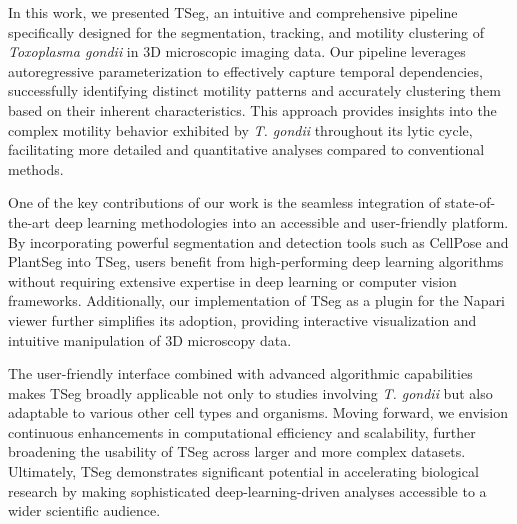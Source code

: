 \documentclass[./dissertation.tex]{subfiles}
\begin{document}
In this work, we presented TSeg, an intuitive and comprehensive pipeline specifically designed for the segmentation, tracking, and motility clustering of \textit{Toxoplasma gondii} in 3D microscopic imaging data. Our pipeline leverages autoregressive parameterization to effectively capture temporal dependencies, successfully identifying distinct motility patterns and accurately clustering them based on their inherent characteristics. This approach provides insights into the complex motility behavior exhibited by \textit{T. gondii} throughout its lytic cycle, facilitating more detailed and quantitative analyses compared to conventional methods.

One of the key contributions of our work is the seamless integration of state-of-the-art deep learning methodologies into an accessible and user-friendly platform. By incorporating powerful segmentation and detection tools such as CellPose and PlantSeg into TSeg, users benefit from high-performing deep learning algorithms without requiring extensive expertise in deep learning or computer vision frameworks. Additionally, our implementation of TSeg as a plugin for the Napari viewer further simplifies its adoption, providing interactive visualization and intuitive manipulation of 3D microscopy data.

The user-friendly interface combined with advanced algorithmic capabilities makes TSeg broadly applicable not only to studies involving \textit{T. gondii} but also adaptable to various other cell types and organisms. Moving forward, we envision continuous enhancements in computational efficiency and scalability, further broadening the usability of TSeg across larger and more complex datasets. Ultimately, TSeg demonstrates significant potential in accelerating biological research by making sophisticated deep-learning-driven analyses accessible to a wider scientific audience.
\end{document}
